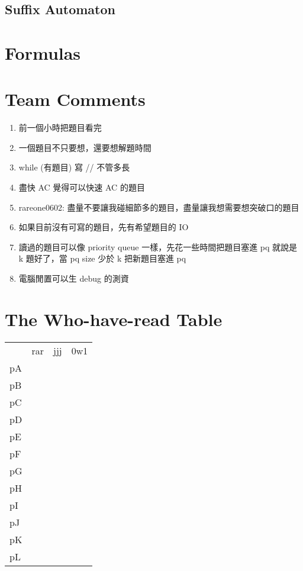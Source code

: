 \subsection{Suffix Automaton}


\section{Formulas}


\section{Team Comments}
\begin{enumerate}
\item 前一個小時把題目看完
\item 一個題目不只要想，還要想解題時間
\item while (有題目) 寫 // 不管多長
\item 盡快 AC 覺得可以快速 AC 的題目
\item rareone0602: 盡量不要讓我碰細節多的題目，盡量讓我想需要想突破口的題目
\item 如果目前沒有可寫的題目，先有希望題目的 IO
\item 讀過的題目可以像 priority queue 一樣，先花一些時間把題目塞進 pq 就說是 k 題好了，當 pq size 少於 k 把新題目塞進 pq
\item 電腦閒置可以生 debug 的測資
\end{enumerate}
\section{The Who-have-read Table}
\begin{table}[]
\begin{tabular}{llll}
   & rar & jjj & 0w1 \\
pA &     &     &     \\
pB &     &     &     \\
pC &     &     &     \\
pD &     &     &     \\
pE &     &     &     \\
pF &     &     &     \\
pG &     &     &     \\
pH &     &     &     \\
pI &     &     &     \\
pJ &     &     &     \\
pK &     &     &     \\
pL &     &     &    
\end{tabular}
\end{table}